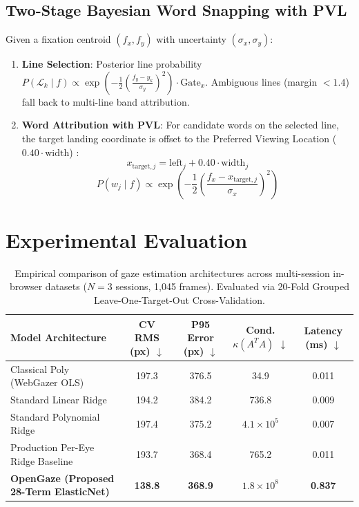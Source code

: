 \documentclass[10pt,twocolumn]{article}
\begin{document}
\subsection{Two-Stage Bayesian Word Snapping with PVL}
Given a fixation centroid $(f_x, f_y)$ with uncertainty $(\sigma_x, \sigma_y)$:
\begin{enumerate}[leftmargin=*]
    \item \textbf{Line Selection}: Posterior line probability $P(\mathcal{L}_k \mid f) \propto \exp\left(-\frac{1}{2} \left(\frac{f_y - y_k}{\sigma_y}\right)^2\right) \cdot \text{Gate}_x$. Ambiguous lines (margin $< 1.4$) fall back to multi-line band attribution.
    \item \textbf{Word Attribution with PVL}: For candidate words on the selected line, the target landing coordinate is offset to the Preferred Viewing Location ($0.40 \cdot \text{width}$) \cite{rayner1979preferred}:
    \begin{equation}
        x_{\text{target},j} = \text{left}_j + 0.40 \cdot \text{width}_j
    \end{equation}
    \begin{equation}
        P(w_j \mid f) \propto \exp\left(-\frac{1}{2} \left(\frac{f_x - x_{\text{target},j}}{\sigma_x}\right)^2\right)
    \end{equation}
\end{enumerate}

\section{Experimental Evaluation}
\label{sec:experiments}

\begin{table}[t]
\centering
\caption{Empirical comparison of gaze estimation architectures across multi-session in-browser datasets ($N=3$ sessions, 1,045 frames). Evaluated via 20-Fold Grouped Leave-One-Target-Out Cross-Validation.}
\label{tab:baseline_comparison}
\begin{tabular}{lcccc}
\toprule
\textbf{Model Architecture} & \textbf{CV RMS (px)} $\downarrow$ & \textbf{P95 Error (px)} $\downarrow$ & \textbf{Cond. $\kappa(A^T A)$} $\downarrow$ & \textbf{Latency (ms)} $\downarrow$ \\
\midrule
Classical Poly (WebGazer OLS) \cite{papoutsaki2016webgazer} & 197.3 & 376.5 & 34.9 & 0.011 \\
Standard Linear Ridge & 194.2 & 384.2 & 736.8 & 0.009 \\
Standard Polynomial Ridge & 197.4 & 375.2 & $4.1 \times 10^5$ & 0.007 \\
Production Per-Eye Ridge Baseline & 193.7 & 368.4 & 765.2 & 0.011 \\
\textbf{OpenGaze (Proposed 28-Term ElasticNet)} & \textbf{138.8} & \textbf{368.9} & $1.8 \times 10^8$ & \textbf{0.837} \\
\bottomrule
\end{tabular}
\end{table}
\end{document}
